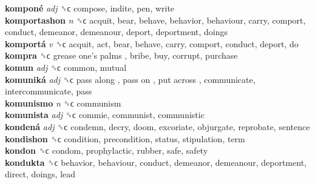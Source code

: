 \textbf{komponé} \emph{adj}  ␝ϲ  compose, indite, pen, write  \\
\textbf{komportashon} \emph{n}  ␝ϲ  acquit, bear, behave, behavior, behaviour, carry, comport, conduct, demeanor, demeanour, deport, deportment, doings  \\
\textbf{komportá} \emph{v}  ␝ϲ  acquit, act, bear, behave, carry, comport, conduct, deport, do  \\
\textbf{kompra} ␝ϲ   grease one’s palms , bribe, buy, corrupt, purchase  \\
\textbf{komun} \emph{adj}  ␝ϲ  common, mutual  \\
\textbf{komuniká} \emph{adj}  ␝ϲ   pass along ,  pass on ,  put across , communicate, intercommunicate, pass  \\
\textbf{komunismo} \emph{n}  ␝ϲ  communism  \\
\textbf{komunista} \emph{adj}  ␝ϲ  commie, communist, communistic  \\
\textbf{kondená} \emph{adj}  ␝ϲ  condemn, decry, doom, excoriate, objurgate, reprobate, sentence  \\
\textbf{kondishon} ␝ϲ  condition, precondition, status, stipulation, term  \\
\textbf{kondon} ␝ϲ  condom, prophylactic, rubber, safe, safety  \\
\textbf{kondukta} ␝ϲ  behavior, behaviour, conduct, demeanor, demeanour, deportment, direct, doings, lead  \\
